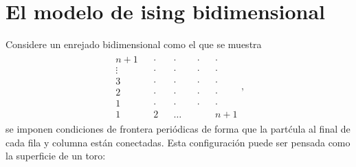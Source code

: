 \documentclass[letterpaper,12pt,oneside]{book}
\begin{document}
\section{El modelo de ising bidimensional}
Considere un enrejado bidimensional como el que se muestra\\
%
\begin{eqnarray}
\begin{matrix}
n+1 && \cdot && \cdot && \cdot && \cdot  \\
\vdots && \cdot && \cdot && \cdot && \cdot  \\
3 && \cdot && \cdot && \cdot && \cdot  \\
2 && \cdot && \cdot && \cdot && \cdot  \\
1 && \cdot && \cdot && \cdot && \cdot  \\
1 && 2 &&   \dots&&  && n+1
\end{matrix}, \nonumber
\end{eqnarray}
%
se imponen condiciones de frontera periódicas de forma que la part\'cula al final de cada fila y columna están conectadas. Esta configuraci\'on puede ser pensada como la superficie de un toro: 
%
\begin{center}
\end{center}
%
\end{document}
